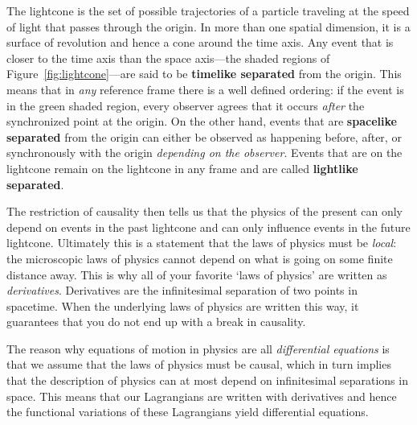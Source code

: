 The lightcone is the set of possible trajectories of a particle traveling at the speed of light that passes through the origin. In more than one spatial dimension, it is a surface of revolution and hence a cone around the time axis. Any event that is closer to the time axis than the space axis---the shaded regions of Figure~\ref{fig:lightcone}---are said to be \textbf{timelike separated} from the origin. This means that in \emph{any} reference frame there is a well defined ordering: if the event is in the green shaded region, every observer agrees that it occurs \emph{after} the synchronized point at the origin. On the other hand, events that are \textbf{spacelike separated} from the origin can either be observed as happening before, after, or synchronously with the origin \emph{depending on the observer}. Events that are on the lightcone remain on the lightcone in any frame and are called \textbf{lightlike separated}.

The restriction of causality then tells us that the physics of the present can only depend on events in the past lightcone and can only influence events in the future lightcone. Ultimately this is a statement that the laws of physics must be \emph{local}: the microscopic laws of physics cannot depend on what is going on some finite distance away. This is why all of your favorite `laws of physics' are written as \emph{derivatives}. Derivatives are the infinitesimal separation of two points in spacetime. When the underlying laws of physics are written this way, it guarantees that you do not end up with a break in causality.

\begin{bigidea}\label{idea:causality:and:derivatives}
The reason why equations of motion in physics are all \emph{differential equations} is that we assume that the laws of physics must be causal, which in turn implies that the description of physics can at most depend on infinitesimal separations in space. This means that our Lagrangians are written with derivatives and hence the functional variations of these Lagrangians yield differential equations.
\end{bigidea}

